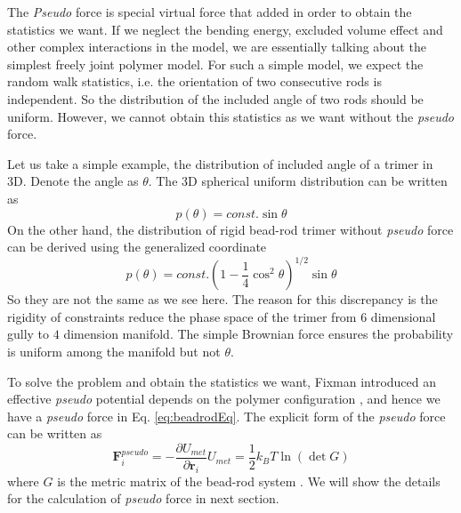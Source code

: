 The \emph{Pseudo} force is special virtual force that added in order to obtain the statistics we want. If we neglect the bending energy, excluded volume effect and other complex interactions in the model, we are essentially talking about the simplest freely joint polymer model. For such a simple model, we expect the random walk statistics, i.e. the orientation of two consecutive rods is independent. So the distribution of the included angle of two rods should be uniform. However, we cannot obtain this statistics as we want without the \emph{pseudo} force.

Let us take a simple example, the distribution of included angle of a trimer in 3D. Denote the angle as $\theta$. The 3D spherical uniform distribution can be written as
\begin{equation}
    \label{eq:trimerUniform}
    p(\theta) = const. \sin\theta
\end{equation}
On the other hand, the distribution of rigid bead-rod trimer without \emph{pseudo} force can be derived using the generalized coordinate
\begin{equation}
    \label{eq:trimerRigid}
    p(\theta) = const. (1-\frac{1}{4}\cos^2\theta)^{1/2}\sin\theta
\end{equation}
So they are not the same as we see here. The reason for this discrepancy is the rigidity of constraints reduce the phase space of the trimer from $6$ dimensional gully to $4$ dimension manifold. The simple Brownian force ensures the probability is uniform among the manifold but not $\theta$. 

To solve the problem and obtain the statistics we want, Fixman introduced an effective \emph{pseudo} potential depends on the polymer configuration \cite{Fixman1974}, and hence we have a \emph{pseudo} force in Eq. \ref{eq:beadrodEq}. The explicit form of the \emph{pseudo} force can be written as
\begin{subequations}
    \label{eq:pseudoForce}
    \begin{equation}
        \mathbf{F}_i^{pseudo} = -\frac{\partial U_{met}}{\partial\mathbf{r}_i}
    \end{equation}
    \begin{equation}
        U_{met} = \frac{1}{2}k_B T \ln(\det G)
    \end{equation}
\end{subequations}
where $G$ is the metric matrix of the bead-rod system \cite{Pasquali2002}. We will show the details for the calculation of \emph{pseudo} force in next section.

